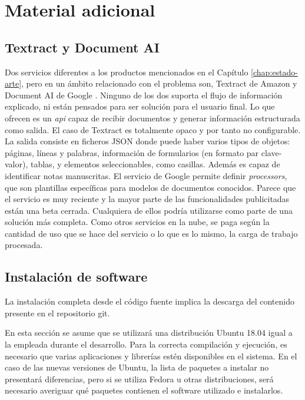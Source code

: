
\chapter{Material adicional}
\label{chap:material-adicional}

\section{Textract y Document AI}
\label{sec:textract-y-document-ai}

Dos servicios diferentes a los productos mencionados en el Capítulo \ref{chap:estado-arte}, pero en un ámbito relacionado con el problema son, Textract de Amazon \cite{solucionesComerciales_amazon_textract} y Document AI de Google \cite{solucionesComerciales_google_documentAI}. Ninguno de los dos suporta el flujo de información explicado, ni están pensados para ser solución para el usuario final. Lo que ofrecen es un \emph{\acrshort{api}} capaz de recibir documentos y generar información estructurada como salida. El caso de Textract es totalmente opaco y por tanto no configurable. La salida consiste en ficheros JSON donde puede haber varios tipos de objetos: páginas, líneas y palabras, información de formularios (en formato par clave-valor), tablas, y elementos seleccionables, como casillas. Además es capaz de identificar notas manuscritas. El servicio de Google permite definir \emph{processors}, que son plantillas específicas para modelos de documentos conocidos. Parece que el servicio es muy reciente y la mayor parte de las funcionalidades publicitadas están una beta cerrada. Cualquiera de ellos podría utilizarse como parte de una solución más completa. Como otros servicios en la nube, se paga según la cantidad de uso que se hace del servicio o lo que es lo mismo, la carga de trabajo procesada.

\section{Instalación de software}
\label{chap:instalacion-software}

La instalación completa desde el código fuente implica la descarga del contenido presente en el repositorio git.

En esta sección se asume que se utilizará una distribución Ubuntu 18.04 igual a la empleada durante el desarrollo. Para la correcta compilación y ejecución, es necesario que varias aplicaciones y librerías estén disponibles en el sistema. En el caso de las nuevas versiones de Ubuntu, la lista de paquetes a instalar no presentará diferencias, pero si se utiliza Fedora u otras distribuciones, será necesario averiguar qué paquetes contienen el software utilizado e instalarlos.


